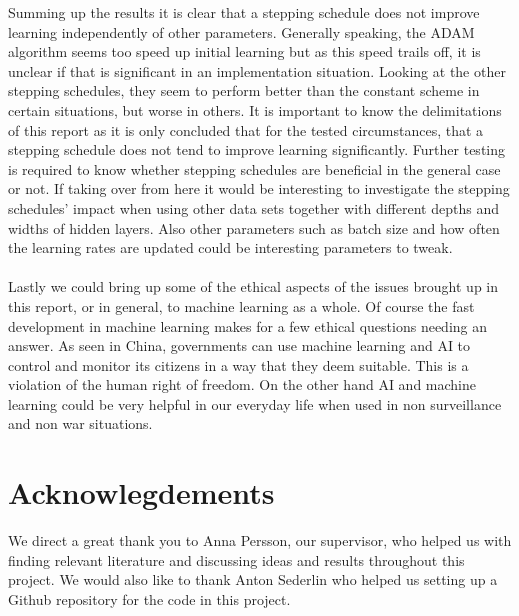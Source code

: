 \documentclass{article}
\begin{document}
Summing up the results it is clear that a stepping schedule does not improve learning independently of other parameters. Generally speaking, the ADAM algorithm seems too speed up initial learning but as this speed trails off, it is unclear if that is significant in an implementation situation. Looking at the other stepping schedules, they seem to perform better than the constant scheme in certain situations, but worse in others. 
\noindent It is important to know the delimitations of this report as it is only concluded that for the tested circumstances, that a stepping schedule does not tend to improve learning significantly. Further testing is required to know whether stepping schedules are beneficial in the general case or not. If taking over from here it would be interesting to investigate the stepping schedules' impact when using other data sets together with different depths and widths of hidden layers. Also other parameters such as batch size and how often the learning rates are updated could be interesting parameters to tweak.\\\\
\noindent Lastly we could bring up some of the ethical aspects of the issues brought up in this report, or in general, to machine learning as a whole. Of course the fast development in machine learning makes for a few ethical questions needing an answer. As seen in China, governments can use machine learning and AI to control and monitor its citizens in a way that they deem suitable. This is a violation of the human right of freedom. On the other hand AI and machine learning could be very helpful in our everyday life when used in non surveillance and non war situations.


\newpage
\section*{Acknowlegdements}
We direct a great thank you to Anna Persson, our supervisor, who helped us with finding relevant literature and discussing ideas and results throughout this project. We would also like to thank Anton Sederlin who helped us setting up a Github repository for the code in this project.
\end{document}
